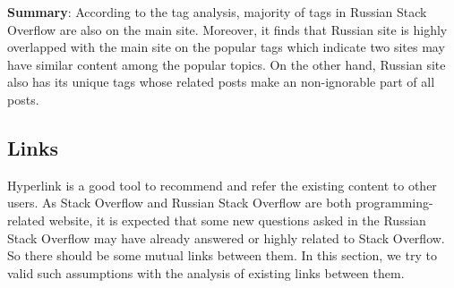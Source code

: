 \textbf{Summary}:
According to the tag analysis, majority of tags in Russian Stack Overflow are also on the main site. Moreover, it finds that Russian site is highly overlapped with the main site on the popular tags which indicate two sites may have similar content among the popular topics. On the other hand, Russian site also has its unique tags whose related posts make an non-ignorable part of all posts. 


\subsection{Links}

Hyperlink is a good tool to recommend and refer the existing content to other users. 
As Stack Overflow and Russian Stack Overflow are both programming-related website, it is expected that some new questions asked in the Russian Stack Overflow may have already answered or highly related to Stack Overflow.
So there should be some mutual links between them.
In this section, we try to valid such assumptions with the analysis of existing links between them.


\noindent {}
\\

